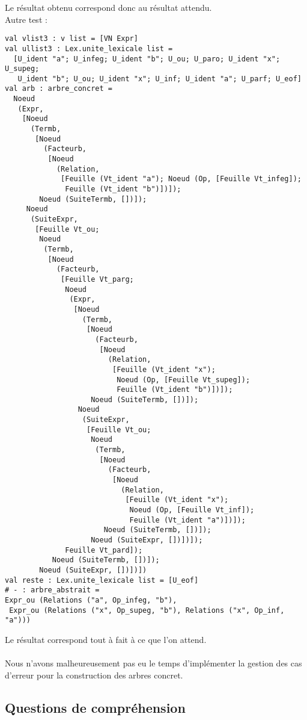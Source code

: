 \documentclass[11pt]{article} %
\begin{document}
Le résultat obtenu correspond donc au résultat attendu.\\
Autre test : \\
\begin{lstlisting}
val vlist3 : v list = [VN Expr]
val ullist3 : Lex.unite_lexicale list =
  [U_ident "a"; U_infeg; U_ident "b"; U_ou; U_paro; U_ident "x"; U_supeg;
   U_ident "b"; U_ou; U_ident "x"; U_inf; U_ident "a"; U_parf; U_eof]
val arb : arbre_concret =
  Noeud
   (Expr,
    [Noeud
      (Termb,
       [Noeud
         (Facteurb,
          [Noeud
            (Relation,
             [Feuille (Vt_ident "a"); Noeud (Op, [Feuille Vt_infeg]);
              Feuille (Vt_ident "b")])]);
        Noeud (SuiteTermb, [])]);
     Noeud
      (SuiteExpr,
       [Feuille Vt_ou;
        Noeud
         (Termb,
          [Noeud
            (Facteurb,
             [Feuille Vt_parg;
              Noeud
               (Expr,
                [Noeud
                  (Termb,
                   [Noeud
                     (Facteurb,
                      [Noeud
                        (Relation,
                         [Feuille (Vt_ident "x");
                          Noeud (Op, [Feuille Vt_supeg]);
                          Feuille (Vt_ident "b")])]);
                    Noeud (SuiteTermb, [])]);
                 Noeud
                  (SuiteExpr,
                   [Feuille Vt_ou;
                    Noeud
                     (Termb,
                      [Noeud
                        (Facteurb,
                         [Noeud
                           (Relation,
                            [Feuille (Vt_ident "x");
                             Noeud (Op, [Feuille Vt_inf]);
                             Feuille (Vt_ident "a")])]);
                       Noeud (SuiteTermb, [])]);
                    Noeud (SuiteExpr, [])])]);
              Feuille Vt_pard]);
           Noeud (SuiteTermb, [])]);
        Noeud (SuiteExpr, [])])])
val reste : Lex.unite_lexicale list = [U_eof]
# - : arbre_abstrait =
Expr_ou (Relations ("a", Op_infeg, "b"),
 Expr_ou (Relations ("x", Op_supeg, "b"), Relations ("x", Op_inf, "a")))
\end{lstlisting}
Le résultat correspond tout à fait à ce que l'on attend.\\
\\ 
Nous n'avons malheureusement pas eu le temps d'implémenter la gestion des cas d'erreur pour la construction des arbres concret.

\subsection{Questions de compréhension}
\end{document}
